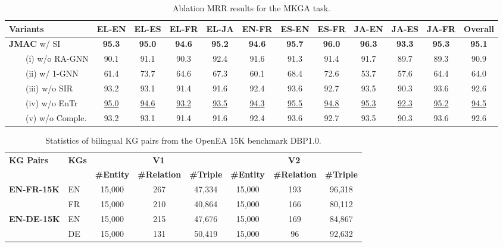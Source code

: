 \documentclass[11pt]{article}
\begin{document}
\begin{table*}[!t]
    \begin{adjustbox}{width=440pt,center}
    \centering
    \setlength{\tabcolsep}{0.3em}
    \begin{tabular}{l|c|c|c|c|c|c|c|c|c|c|c}
    \hline
    \textbf{Variants} & \textbf{EL-EN} & \textbf{EL-ES} & \textbf{EL-FR} & \textbf{EL-JA} & \textbf{EN-FR} & \textbf{ES-EN} & \textbf{ES-FR} & \textbf{JA-EN} & \textbf{JA-ES} &  \textbf{JA-FR} & \textbf{Overall} \\
\hline
    \textbf{JMAC}  w/ SI & \bf 95.3 & \bf 95.0 & \bf 94.6 & \bf 95.2 & \bf 94.6 & \bf 95.7 & \bf 96.0 & \bf 96.3 & \bf 93.3 & \bf 95.3 & \bf 95.1 \\
    \hline
    \ \ \ \ (i) w/o RA-GNN & 90.1 & 91.1 & 90.3 & 92.4 & 91.6 & 91.3 & 91.4 & 91.7 & 89.7 & 89.3 & 90.9 \\
    \ \ \ \ (ii) w/ 1-GNN & 61.4 & 73.7 & 64.6 & 67.3 & 60.1 & 68.4 & 72.6 & 53.7 & 57.6 & 64.4 & 64.0 \\
    \ \ \ \ (iii) w/o SIR & 93.2 & 93.1 & 91.4 & 91.6 & 92.4 & 93.6 & 92.7 & 93.5 & 90.3 & 93.6 & 92.6 \\
    \ \ \ \ (iv) w/o EnTr & \underline{95.0} & \underline{94.6} & \underline{93.2} & \underline{93.5} & \underline{94.3} & \underline{95.5} & \underline{94.8} & \underline{95.3} & \underline{92.3} & \underline{95.2} & \underline{94.5} \\
    \ \ \ \ (v) w/o Comple. & 93.2 & 93.1 & 91.4 & 91.6 & 92.4 & 93.6 & 92.7 & 93.5 & 90.3 & 93.6 & 92.6 \\
    \hline
    \end{tabular}
    \end{adjustbox}
    \caption{Ablation MRR results for the MKGA task.}
    \label{tab:ablation_kga_detailMRR}
\end{table*}


\begin{table*}[!h]
\centering
\begin{tabular}{l|l|ccc|ccc}
\hline
\multirow{2}{*}{\bf KG Pairs} & \multirow{2}{*}{\bf  KGs} & \multicolumn{3}{c|}{\bf V1} & \multicolumn{3}{c}{\bf V2} \\
\cline{3-8} 
& &  \textbf{\#Entity}  & \textbf{\#Relation}  & \textbf{\#Triple}  &  \textbf{\#Entity} &  \textbf{\#Relation} & \textbf{\#Triple}  \\
\hline
\multirow{2}{*}{\bf  EN-FR-15K} & EN & 15,000 & 267 & 47,334 & 15,000 & 193 & 96,318 \\
& FR & 15,000 & 210 & 40,864 & 15,000 & 166 & 80,112 \\
\hline
\multirow{2}{*}{\bf  EN-DE-15K} & EN & 15,000 & 215 & 47,676 & 15,000 & 169 & 84,867 \\
& DE & 15,000 & 131 & 50,419 & 15,000 & 96 & 92,632 \\
\hline
\end{tabular}
\caption{Statistics of bilingual KG pairs from the OpenEA 15K benchmark DBP1.0.}
\label{tab:openeastat}
\end{table*}
\end{document}
